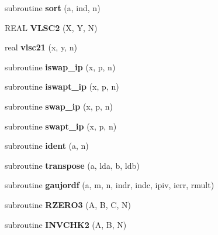 \begin{CompactItemize}
\item 
\hypertarget{mat1_8F_fe46b1d4d7c6bffb46d1997bec21c471}{
subroutine \textbf{sort} (a, ind, n)}
\label{mat1_8F_fe46b1d4d7c6bffb46d1997bec21c471}

\item 
\hypertarget{mat1_8F_391b1bf15f9a50f8f84257352dcb7d43}{
REAL \textbf{VLSC2} (X, Y, N)}
\label{mat1_8F_391b1bf15f9a50f8f84257352dcb7d43}

\item 
\hypertarget{mat1_8F_781d19c3bd1bb876b0bb7244305235f9}{
real \textbf{vlsc21} (x, y, n)}
\label{mat1_8F_781d19c3bd1bb876b0bb7244305235f9}

\item 
\hypertarget{mat1_8F_738abeedcb1c393dd45b76c72b18939f}{
subroutine \textbf{iswap\_\-ip} (x, p, n)}
\label{mat1_8F_738abeedcb1c393dd45b76c72b18939f}

\item 
\hypertarget{mat1_8F_48aadfd4c5ae7f9588ead06b211b5fbc}{
subroutine \textbf{iswapt\_\-ip} (x, p, n)}
\label{mat1_8F_48aadfd4c5ae7f9588ead06b211b5fbc}

\item 
\hypertarget{mat1_8F_cd64b32ff13a1eb34a524db923eb4654}{
subroutine \textbf{swap\_\-ip} (x, p, n)}
\label{mat1_8F_cd64b32ff13a1eb34a524db923eb4654}

\item 
\hypertarget{mat1_8F_4a77e458606ff48b2b8807f32c52e967}{
subroutine \textbf{swapt\_\-ip} (x, p, n)}
\label{mat1_8F_4a77e458606ff48b2b8807f32c52e967}

\item 
\hypertarget{mat1_8F_8a2ffe21627ed404094a75d5f5fcf82c}{
subroutine \textbf{ident} (a, n)}
\label{mat1_8F_8a2ffe21627ed404094a75d5f5fcf82c}

\item 
\hypertarget{mat1_8F_17c0ecae12cc5c6096939885da90ad2b}{
subroutine \textbf{transpose} (a, lda, b, ldb)}
\label{mat1_8F_17c0ecae12cc5c6096939885da90ad2b}

\item 
\hypertarget{mat1_8F_433d25d905b7a824887d47406928b47b}{
subroutine \textbf{gaujordf} (a, m, n, indr, indc, ipiv, ierr, rmult)}
\label{mat1_8F_433d25d905b7a824887d47406928b47b}

\item 
\hypertarget{mat1_8F_7c026efa32899c7f420e4db8d22a52b4}{
subroutine \textbf{RZERO3} (A, B, C, N)}
\label{mat1_8F_7c026efa32899c7f420e4db8d22a52b4}

\item 
\hypertarget{mat1_8F_d955a28235117de614ee2131740f261e}{
subroutine \textbf{INVCHK2} (A, B, N)}
\label{mat1_8F_d955a28235117de614ee2131740f261e}


\end{CompactItemize}
